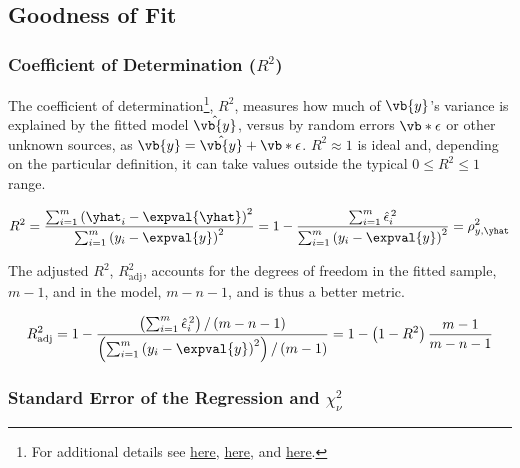 \subsection{Goodness of Fit}
\label{regression:linear:goodness_of_fit}

\subsubsection{Coefficient of Determination ($R^{2}$)}
\label{regression:linear:goodness_of_fit:R2}

The coefficient of determination\footnote{For additional details see
\href{https://economictheoryblog.com/2014/11/05/the-coefficient-of-determination-latex-r2/}{here},
\href{https://economictheoryblog.com/2014/11/05/proof/}{here}, and
\href{http://people.duke.edu/~rnau/rsquared.htm}{here}.}, $R^{2}$,
measures how much of $\vb{y}$'s variance is explained by the fitted model $\hat{\vb{y}}$,
versus by random errors $\vb*{\epsilon}$ or other unknown sources,
as $\vb{y} = \hat{\vb{y}} + \vb*{\epsilon}$.
$R^{2} \approx 1$ is ideal and, depending on the particular definition,
it can take values outside the typical $0 \leq R^{2} \leq 1$ range.

\begin{equation}\label{eq:regression:linear:goodness_of_fit:R2}
R^{2} = \frac{
\sum_{i=1}^{m} \left(\yhat_{i} - \expval{\yhat}\right)^{2}
}{
\sum_{i=1}^{m} \left(y_{i} - \expval{y}\right)^{2}
} = 1 - \frac{
\sum_{i=1}^{m} \hat{\epsilon}_{i}^{\,2}
}{
\sum_{i=1}^{m} \left(y_{i} - \expval{y}\right)^{2}
} = \rho_{y,\yhat}^{2}
\end{equation}

The adjusted $R^{2}$, $R^{2}_{\text{adj}}$, accounts for the degrees of freedom in the
fitted sample, $m-1$, and in the model, $m-n-1$, and is thus a better metric.

\begin{equation}\label{eq:regression:linear:goodness_of_fit:R2_adj}
R^{2}_{\text{adj}} = 1 - \frac{
\left(\sum_{i=1}^{m} \hat{\epsilon}_{i}^{\,2}\right)/\left(m-n-1\right)
}{
\left(\sum_{i=1}^{m} \left(y_{i} - \expval{y}\right)^{2}\right)/\left(m-1\right)
}
= 1 - \left(1-R^{2}\right)\frac{m-1}{m-n-1}
\end{equation}

\subsubsection{Standard Error of the Regression and $\chi_{\nu}^{2}$}
\label{regression:linear:goodness_of_fit:reduced_chi2}

